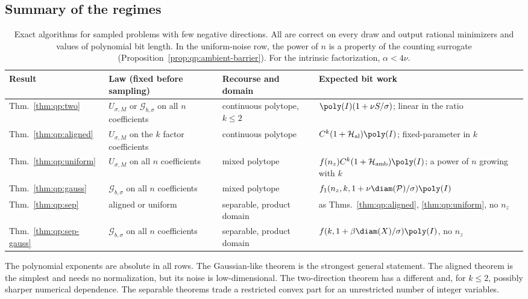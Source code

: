 \subsection{Summary of the regimes}\label{sec:qp:summary}

\begin{table}[ht]
\centering
\small
\begin{tabularx}{\textwidth}{@{}lXXX@{}}
\toprule
Result & Law (fixed before sampling) & Recourse and domain & Expected bit work \\
\midrule
Thm.~\ref{thm:qp:two} & $U_{\sigma,M}$ or $\mathcal G_{b,\sigma}$ on all $n$ coefficients & continuous polytope, $k\le2$ & $\poly(I)(1+\nu S/\sigma)$; linear in the ratio \\
Thm.~\ref{thm:qp:aligned} & $U_{\sigma,M}$ on the $k$ factor coefficients & continuous polytope & $C^k(1+\mathcal H_{\rm al})\poly(I)$; fixed-parameter in $k$ \\
Thm.~\ref{thm:qp:uniform} & $U_{\sigma,M}$ on all $n$ coefficients & mixed polytope & $f(n_z)C^k(1+\mathcal H_{\rm amb})\poly(I)$; a power of $n$ growing with $k$ \\
Thm.~\ref{thm:qp:gauss} & $\mathcal G_{b,\sigma}$ on all $n$ coefficients & mixed polytope & $f_1(n_z,k,1+\nu\diam(\mathcal P)/\sigma)\poly(I)$ \\
Thm.~\ref{thm:qp:sep} & aligned or uniform & separable, product domain & as Thms.~\ref{thm:qp:aligned}, \ref{thm:qp:uniform}, no $n_z$ \\
Thm.~\ref{thm:qp:sep-gauss} & $\mathcal G_{b,\sigma}$ on all $n$ coefficients & separable, product domain & $f(k,1+\beta\diam(X)/\sigma)\poly(I)$, no $n_z$ \\
\bottomrule
\end{tabularx}
\caption{Exact algorithms for sampled problems with few negative directions.
All are correct on every draw and output rational minimizers and values of
polynomial bit length. In the uniform-noise row, the power of $n$ is a property
of the counting surrogate (Proposition~\ref{prop:qp:ambient-barrier}). For the
intrinsic factorization, $\alpha<4\nu$.}
\label{tab:qp:regimes}
\end{table}

The polynomial exponents are absolute in all rows. The Gaussian-like theorem
is the strongest general statement. The aligned theorem is the simplest and
needs no normalization, but its noise is low-dimensional. The two-direction
theorem has a different and, for $k\le2$, possibly sharper numerical
dependence. The separable theorems trade a restricted convex part for an
unrestricted number of integer variables.
